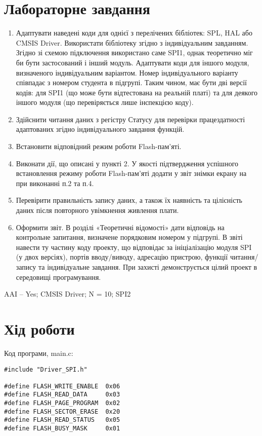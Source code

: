 \documentclass[oneside,14pt]{extarticle}
\begin{document}
\begin{normalsize}
  \section*{Лабораторне завдання}
  \begin{enumerate}
  	\item Адаптувати наведені коди для однієї з перелічених бібліотек: SPL, HAL або
CMSIS Driver. Використати бібліотеку згідно з індивідуальним завданням.
Згідно зі схемою підключення використано саме SPI1, однак теоретично міг
би бути застосований і інший модуль. Адаптувати коди для іншого модуля,
визначеного індивідуальним варіантом. Номер індивідуального варіанту
співпадає з номером студента в підгрупі. Таким чином, має бути дві версії
кодів: для SPI1 (що може бути відтестована на реальній платі) та для
деякого іншого модуля (що перевіряється лише інспекцією коду).
  \item Здійснити читання даних з регістру Статусу для перевірки працездатності
адаптованих згідно індивідуального завдання функцій.
  \item Встановити відповідний режим роботи Flash-пам'яті.
  \item Виконати дії, що описані у пункті 2. У якості підтвердження успішного
встановлення режиму роботи Flash-пам'яті додати у звіт знімки екрану на
при виконанні п.2 та п.4.
  \item Перевірити правильність запису даних, а також їх наявність та цілісність
даних після повторного увімкнення живлення плати.
  \item Оформити звіт. В розділі «Теоретичні відомості» дати відповідь на
контрольне запитання, визначене порядковим номером у підгрупі. В звіті
навести ту частину коду проекту, що відповідає за ініціалізацію модуля SPI
(у двох версіях), портів вводу/виводу, адресацію пристрою, функції
читання/запису та індивідуальне завдання. При захисті демонструється
цілий проект в середовищі програмування.
  \end{enumerate}
  
  AAI – Yes; CMSIS Driver; N = 10; SPI2
  
  \section*{Хід роботи}
  
  Код програми, main.c:
  
	{\small\begin{lstlisting}
#include "Driver_SPI.h"

#define FLASH_WRITE_ENABLE  0x06
#define FLASH_READ_DATA     0x03
#define FLASH_PAGE_PROGRAM  0x02
#define FLASH_SECTOR_ERASE  0x20
#define FLASH_READ_STATUS   0x05
#define FLASH_BUSY_MASK     0x01


\end{lstlisting}}
\end{normalsize}
\end{document}
